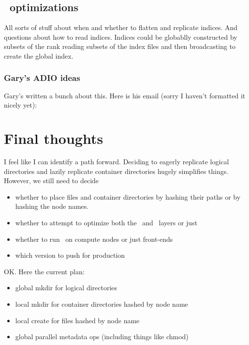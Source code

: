 \documentclass[10pt]{article}
\begin{document}
\subsection{\adio\ optimizations}
\label{sec-adio-opt}

All sorts of stuff about when and whether to flatten and replicate indices.
And questions about how to read indices.  Indices could be globablly
constructed by subsets of the rank reading subsets of the index files and then
broadcasting to create the global index.  

\subsubsection{Gary's ADIO ideas}
Gary's written a bunch about this.
Here is his email (sorry I haven't formatted it nicely yet):




\section{Final thoughts}

I feel like I can identify a path forward.  Deciding to eagerly replicate
logical directories and lazily replicate container directories hugely
simplifies things.  However, we still need to decide 

\begin{itemize}
\item{whether to place files and 
container directories by hashing their paths or by hashing the node names.  
}
\item{whether to attempt to optimize both the \adio\ and \fuse\ layers or
just \adio}
\item{whether to run \fuse\ on compute nodes or just front-ends}
\item{which version to push for production}
\end{itemize}

OK.  Here the current plan:

\begin{itemize}
\item{global mkdir for logical directories}
\item{local mkdir for container directories hashed by node name}
\item{local create for files hashed by node name}
\item{global parallel metadata ops (including things like chmod)}
\end{itemize}
\end{document}
